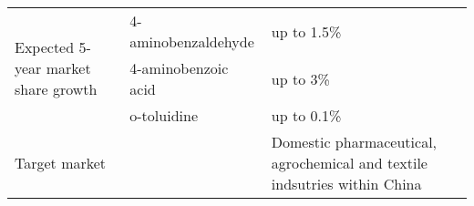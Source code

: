 \begin{landscape}
\begin{table}[]
\begin{tabular}{@{}|l|l|l|@{}}
\multirow{3}{*}{Expected 5-year market share growth} & 4-aminobenzaldehyde & up to 1.5\%                                                                                                                                                                                                                                                                                                                                                                                                           \\ \cmidrule(l){2-3} 
                                                     & 4-aminobenzoic acid & up to 3\%                                                                                                                                                                                                                                                                                                                                                                                                             \\ \cmidrule(l){2-3} 
                                                     & o-toluidine         & up to 0.1\%                                                                                                                                                                                                                                                                                                                                                                                                           \\ \midrule
\multicolumn{2}{|l|}{Target market}                                        & Domestic pharmaceutical, agrochemical and textile indsutries within China                                                                                                                                                                                                                                                                                                                                             \\ \bottomrule
\end{tabular}
\end{table}
\end{landscape}